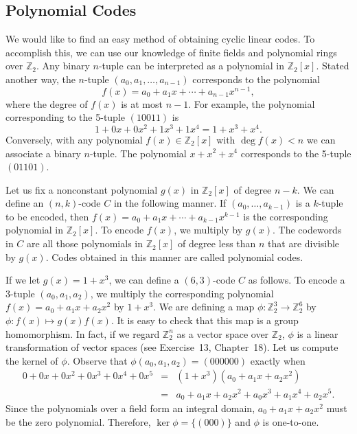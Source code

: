 \subsection*{Polynomial Codes}

We would like to find an easy method of obtaining cyclic linear codes.  To accomplish this, we can use our knowledge of finite fields and  polynomial rings over ${\mathbb Z}_2$.  Any binary $n$-tuple can be
interpreted as a polynomial in ${\mathbb Z}_2[x]$.  Stated another way, the $n$-tuple $(a_0, a_1, \ldots, a_{n-1} )$ corresponds to the polynomial
$$
f(x) = a_0 +  a_1 x +  \cdots + a_{n-1} x^{n-1},
$$
where the degree of $f(x)$ is at most $n-1$.   For example, the polynomial corresponding to the 5-tuple $(10011)$ is  
$$
1 + 0 x + 0 x^2 + 1 x^3 + 1 x^4 = 1 + x^3 + x^4.
$$
Conversely, with any polynomial $f(x) \in {\mathbb Z}_2[x]$ with $\deg f(x) < n$ we can associate a binary $n$-tuple.  The polynomial $x + x^2 + x^4$ corresponds to the 5-tuple $(01101)$.

Let us fix a nonconstant polynomial $g(x)$ in ${\mathbb Z}_2[x]$ of degree \mbox{$n - k$}.  We can define an $(n,k)$-code $C$ in the following manner.  If $(a_0, \ldots, a_{k-1})$ is a $k$-tuple to be encoded, then $f(x) = a_0 + a_1 x +  \cdots + a_{k-1} x^{k-1}$ is the corresponding polynomial
in ${\mathbb Z}_2[x]$.  To encode $f(x)$, we multiply by $g(x)$.  The codewords in $C$ are all those polynomials in ${\mathbb Z}_2[x]$ of degree less than  $n$ that are divisible by $g(x)$.  Codes obtained in this manner are called {\bfi polynomial codes}.  

\medskip

If we let $g(x)= 1 + x^3$, we can define a $(6,3)$-code $C$ as follows.  To encode a 3-tuple $( a_0, a_1, a_2 )$, we multiply the corresponding polynomial $f(x) = a_0 + a_1 x + a_2 x^2$ by $1 + x^3$.  We are defining a map $\phi : {\mathbb Z}_2^3 \rightarrow {\mathbb Z}_2^6$ by $\phi  : f(x) \mapsto g(x) f(x)$.  It is easy to check that this map is a group homomorphism.  In fact, if we regard ${\mathbb Z}_2^n$ as a vector space over ${\mathbb Z}_2$, $\phi$ is a linear transformation of vector spaces (see Exercise~13, Chapter~18).  Let us compute the kernel of $\phi$.  Observe that $\phi ( a_0, a_1, a_2 ) = (000000)$ exactly when 
\begin{eqnarray*}
0 + 0x + 0x^2 + 0x^3 + 0x^4 + 0 x^5 
& = & (1 + x^3) ( a_0 + a_1 x + a_2 x^2 ) \\ 
& = & a_0 + a_1 x + a_2 x^2 + a_0 x^3 + a_1 x^4 + a_2 x^5.
\end{eqnarray*}
Since the polynomials over a field form an integral domain, $a_0 + a_1 x + a_2 x^2$ must be the zero polynomial. Therefore, $\ker \phi = \{ (000) \}$ and $\phi$ is one-to-one. 
 

